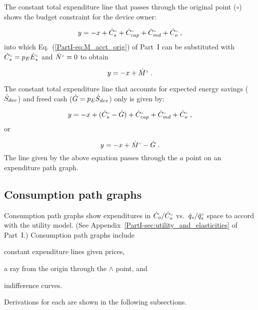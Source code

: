 The constant total expenditure line 
that passes through the original point ($\circ$)
shows the budget constraint for the device owner:

\begin{equation}
  y = -x + {}{\dot{C}}^{\scriptscriptstyle \circ}_s + {}{\dot{C}}^{\scriptscriptstyle \circ}_{cap} + {}{\dot{C}}^{\scriptscriptstyle \circ}_{md} + {}{\dot{C}}^{\scriptscriptstyle \circ}_o \; ,
\end{equation}
%
into which Eq.~(\ref{PartI-eq:M_acct_orig}) of Part~I can be substituted with 
${}{\dot{C}}^{\scriptscriptstyle \circ}_s = p_E {}{\dot{E}}^{\scriptscriptstyle \circ}_s$ and 
${}{\dot{N}}^{\scriptscriptstyle \circ} = 0$ to obtain

\begin{equation}
  y = -x + {}{\dot{M}}^{\scriptscriptstyle \circ} \; .
\end{equation}

The constant total expenditure line 
that accounts for expected energy savings ($\dot{S}_{dev}$) 
and freed cash ($\dot{G} = p_E \dot{S}_{dev}$) only 
is given by:

\begin{equation}
  y = -x + ({}{\dot{C}}^{\scriptscriptstyle \circ}_s - \dot{G}) + {}{\dot{C}}^{\scriptscriptstyle \circ}_{cap} + {}{\dot{C}}^{\scriptscriptstyle \circ}_{md} + {}{\dot{C}}^{\scriptscriptstyle \circ}_o \; ,
\end{equation}
%
or

\begin{equation}
  y = -x + {}{\dot{M}}^{\scriptscriptstyle \circ} - \dot{G}\; .
\end{equation}
%
The line given by the above equation
passes through the $a$ point on an expenditure path graph.


\subsection{Consumption path graphs}
\label{sec:cons_path_graph_details}

Consumption path graphs show expenditures in 
$\dot{C}_o/{}{\dot{C}}^{\scriptscriptstyle \circ}_o$ vs.\ $\dot{q}_s/{}{\dot{q}}^{\scriptscriptstyle \circ}_s$ space
to accord with the utility model.
(See Appendix~\ref{PartI-sec:utility_and_elasticities} of Part~I.)
Consumption path graphs include 
%
\begin{enumerate*}[label={(\roman*)}]
	
  \item constant expenditure lines given prices,
  
  \item a ray from the origin through the $\wedge$ point, and 
  
  \item indifference curves.
    
\end{enumerate*}
%
Derivations for each are shown in the following subsections.



